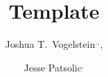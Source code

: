 \documentclass{article}
\title{Template}
\author{%
    Joshua T.~Vogelstein\endnotemark[0]$^,$\endnotemark[1]$^,$\endnotemark[2],
    \and
    Jesse Patsolic\endnotemark[2]$^,$\endnotemark[3]
}
\begin{document}




\clearpage




\theendnotes
\end{document}
